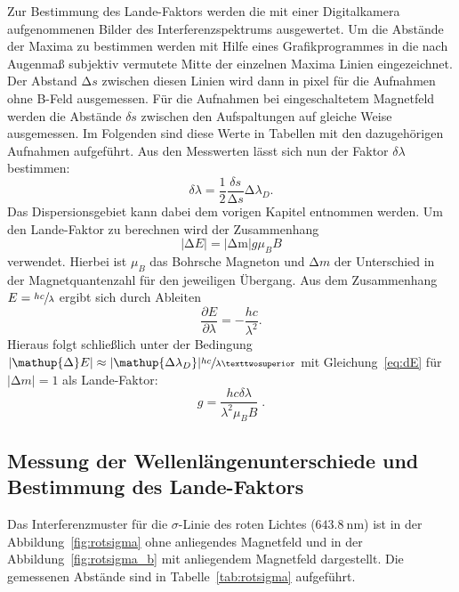 Zur Bestimmung des Lande-Faktors werden die mit einer Digitalkamera aufgenommenen Bilder des Interferenzspektrums ausgewertet. Um die Abstände der Maxima zu bestimmen werden mit Hilfe eines Grafikprogrammes in die nach Augenmaß subjektiv vermutete Mitte der einzelnen Maxima Linien eingezeichnet. Der Abstand $\mathup{\Delta} s$ zwischen diesen Linien wird dann in pixel für die Aufnahmen ohne B-Feld ausgemessen. Für die Aufnahmen bei eingeschaltetem Magnetfeld werden die Abstände $\delta s$ zwischen den Aufspaltungen auf gleiche Weise ausgemessen. Im Folgenden sind diese Werte in Tabellen mit den dazugehörigen Aufnahmen aufgeführt. Aus den Messwerten lässt sich nun der Faktor $\delta\lambda$ bestimmen:
%
\begin{equation}
  \delta\lambda=\frac{1}{2}\frac{\delta s}{\mathup{\Delta} s}\mathup{\Delta}\lambda_D.
  \label{eq:dlambda}
\end{equation}
%
Das Dispersionsgebiet kann dabei dem vorigen Kapitel entnommen werden. Um den Lande-Faktor zu berechnen wird der Zusammenhang
%
\begin{equation}
  |\mathup{\Delta}E|=|\mathup{\Delta m}|g\mu_BB
  \label{eq:dE}
\end{equation}
%
verwendet. Hierbei ist $\mu_B$ das Bohrsche Magneton und $\mathup{\Delta}m$ der Unterschied in der Magnetquantenzahl für den jeweiligen Übergang. Aus dem Zusammenhang $E=\sfrac{hc}{\lambda}$ ergibt sich durch Ableiten
%
\begin{equation}
  \frac{\partial E}{\partial\lambda}=-\frac{hc}{\lambda^2}.
  \label{eq:partE}
\end{equation}
%
Hieraus folgt schließlich unter der Bedingung $|\mathup{\Delta}E|\approx|\mathup{\Delta\lambda_D}|\sfrac{hc}{\lambda²}$ mit Gleichung~\eqref{eq:dE} für $|\mathup{\Delta}m|=1$ als Lande-Faktor:
%
\begin{equation}
  g=\frac{hc\delta\lambda}{\lambda^2\mu_BB}\; .
  \label{eq:lande}
\end{equation}

\subsection{Messung der Wellenlängenunterschiede und Bestimmung des Lande-Faktors}

Das Interferenzmuster für die $\sigma$-Linie des roten Lichtes ($\SI{643,8}{\nano\meter}$) ist in der Abbildung~\ref{fig:rotsigma} ohne anliegendes Magnetfeld und in der Abbildung~\ref{fig:rotsigma_b} mit anliegendem Magnetfeld dargestellt. Die gemessenen Abstände sind in Tabelle~\ref{tab:rotsigma} aufgeführt.


